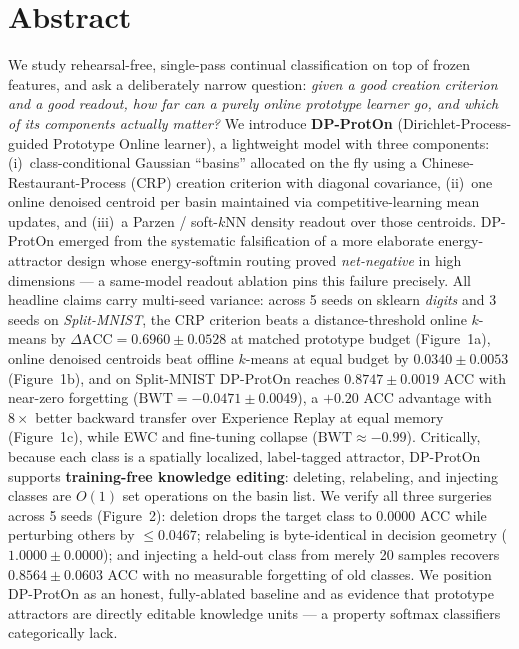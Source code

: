 \documentclass[11pt,a4paper]{article}
\begin{document}
\section{Abstract}

We study rehearsal-free, single-pass continual classification on top of frozen features, and ask a deliberately narrow question: \textit{given a good creation criterion and a good readout, how far can a purely online prototype learner go, and which of its components actually matter?} We introduce \textbf{DP-ProtOn} (Dirichlet-Process-guided Prototype Online learner), a lightweight model with three components: (i)~class-conditional Gaussian ``basins'' allocated on the fly using a Chinese-Restaurant-Process (CRP) creation criterion with diagonal covariance, (ii)~one online denoised centroid per basin maintained via competitive-learning mean updates, and (iii)~a Parzen / soft-$k$NN density readout over those centroids. DP-ProtOn emerged from the systematic falsification of a more elaborate energy-attractor design whose energy-softmin routing proved \textit{net-negative} in high dimensions — a same-model readout ablation pins this failure precisely. All headline claims carry multi-seed variance: across 5 seeds on sklearn \textit{digits} and 3 seeds on \textit{Split-MNIST}, the CRP criterion beats a distance-threshold online $k$-means by $\Delta\text{ACC}=0.6960\pm0.0528$ at matched prototype budget (Figure~1a), online denoised centroids beat offline $k$-means at equal budget by $0.0340\pm0.0053$ (Figure~1b), and on Split-MNIST DP-ProtOn reaches $0.8747\pm0.0019$ ACC with near-zero forgetting ($\text{BWT}=-0.0471\pm0.0049$), a $+0.20$ ACC advantage with $8\times$ better backward transfer over Experience Replay at equal memory (Figure~1c), while EWC and fine-tuning collapse ($\text{BWT}\approx-0.99$). Critically, because each class is a spatially localized, label-tagged attractor, DP-ProtOn supports \textbf{training-free knowledge editing}: deleting, relabeling, and injecting classes are $O(1)$ set operations on the basin list. We verify all three surgeries across 5 seeds (Figure~2): deletion drops the target class to 0.0000 ACC while perturbing others by $\le 0.0467$; relabeling is byte-identical in decision geometry ($1.0000\pm0.0000$); and injecting a held-out class from merely 20 samples recovers $0.8564\pm0.0603$ ACC with no measurable forgetting of old classes. We position DP-ProtOn as an honest, fully-ablated baseline and as evidence that prototype attractors are directly editable knowledge units — a property softmax classifiers categorically lack.
\end{document}
